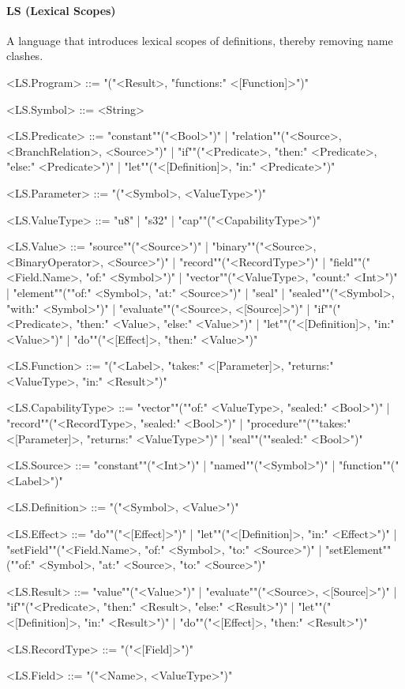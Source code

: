 \documentclass[main.tex]{subfiles}
\begin{document}
\paragraph{ LS (Lexical Scopes) } A language that introduces lexical scopes of definitions, thereby removing name clashes.
\begin{grammar}
	\footnotesize
				<LS.Program> ::=
							"("<Result>, "functions:" <[Function]>")"
				\par
				<LS.Symbol> ::=
						<String>
				\par
				<LS.Predicate> ::=
						"constant""("<Bool>")"
						| "relation""("<Source>, <BranchRelation>, <Source>")"
						| "if""("<Predicate>, "then:" <Predicate>, "else:" <Predicate>")"
						| "let""("<[Definition]>, "in:" <Predicate>")"
				\par
				<LS.Parameter> ::=
							"("<Symbol>, <ValueType>")"
				\par
				<LS.ValueType> ::=
						"u8"
						| "s32"
						| "cap""("<CapabilityType>")"
				\par
				<LS.Value> ::=
						"source""("<Source>")"
						| "binary""("<Source>, <BinaryOperator>, <Source>")"
						| "record""("<RecordType>")"
						| "field""("<Field.Name>, "of:" <Symbol>")"
						| "vector""("<ValueType>, "count:" <Int>")"
						| "element""(""of:" <Symbol>, "at:" <Source>")"
						| "seal"
						| "sealed""("<Symbol>, "with:" <Symbol>")"
						| "evaluate""("<Source>, <[Source]>")"
						| "if""("<Predicate>, "then:" <Value>, "else:" <Value>")"
						| "let""("<[Definition]>, "in:" <Value>")"
						| "do""("<[Effect]>, "then:" <Value>")"
				\par
				<LS.Function> ::=
							"("<Label>, "takes:" <[Parameter]>, "returns:" <ValueType>, "in:" <Result>")"
				\par
				<LS.CapabilityType> ::=
						"vector""(""of:" <ValueType>, "sealed:" <Bool>")"
						| "record""("<RecordType>, "sealed:" <Bool>")"
						| "procedure""(""takes:" <[Parameter]>, "returns:" <ValueType>")"
						| "seal""(""sealed:" <Bool>")"
				\par
				<LS.Source> ::=
						"constant""("<Int>")"
						| "named""("<Symbol>")"
						| "function""("<Label>")"
				\par
				<LS.Definition> ::=
							"("<Symbol>, <Value>")"
				\par
				<LS.Effect> ::=
						"do""("<[Effect]>")"
						| "let""("<[Definition]>, "in:" <Effect>")"
						| "setField""("<Field.Name>, "of:" <Symbol>, "to:" <Source>")"
						| "setElement""(""of:" <Symbol>, "at:" <Source>, "to:" <Source>")"
				\par
				<LS.Result> ::=
						"value""("<Value>")"
						| "evaluate""("<Source>, <[Source]>")"
						| "if""("<Predicate>, "then:" <Result>, "else:" <Result>")"
						| "let""("<[Definition]>, "in:" <Result>")"
						| "do""("<[Effect]>, "then:" <Result>")"
				\par
				<LS.RecordType> ::=
							"("<[Field]>")"
				\par
				<LS.Field> ::=
							"("<Name>, <ValueType>")"
				\par
\end{grammar}
\par
\end{document}
